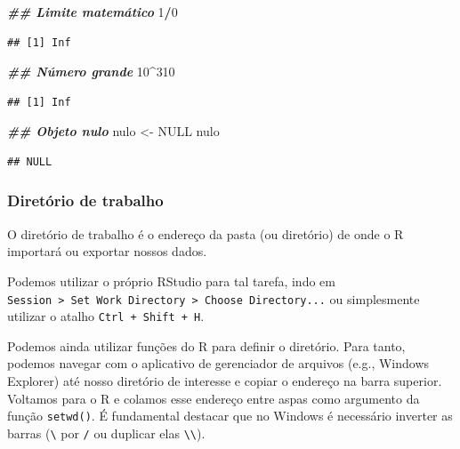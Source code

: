 \documentclass[
]{article}
\newenvironment{Shaded}{\begin{snugshade}}{\end{snugshade}}
\newcommand{\ConstantTok}[1]{\textcolor[rgb]{0.56,0.35,0.01}{#1}}
\newcommand{\DecValTok}[1]{\textcolor[rgb]{0.00,0.00,0.81}{#1}}
\newcommand{\DocumentationTok}[1]{\textcolor[rgb]{0.56,0.35,0.01}{\textbf{\textit{#1}}}}
\newcommand{\NormalTok}[1]{#1}
\newcommand{\OtherTok}[1]{\textcolor[rgb]{0.56,0.35,0.01}{#1}}
\newcommand{\SpecialCharTok}[1]{\textcolor[rgb]{0.81,0.36,0.00}{\textbf{#1}}}
\begin{document}
\begin{Shaded}
\begin{Highlighting}[]
\DocumentationTok{\#\# Limite matemático}
\DecValTok{1}\SpecialCharTok{/}\DecValTok{0}
\end{Highlighting}
\end{Shaded}

\begin{verbatim}
## [1] Inf
\end{verbatim}

\begin{Shaded}
\begin{Highlighting}[]
\DocumentationTok{\#\# Número grande}
\DecValTok{10}\SpecialCharTok{\^{}}\DecValTok{310}
\end{Highlighting}
\end{Shaded}

\begin{verbatim}
## [1] Inf
\end{verbatim}

\begin{Shaded}
\begin{Highlighting}[]
\DocumentationTok{\#\# Objeto nulo}
\NormalTok{nulo }\OtherTok{\textless{}{-}} \ConstantTok{NULL}
\NormalTok{nulo}
\end{Highlighting}
\end{Shaded}

\begin{verbatim}
## NULL
\end{verbatim}

\hypertarget{diretuxf3rio-de-trabalho}{%
\subsubsection{Diretório de trabalho}\label{diretuxf3rio-de-trabalho}}

O diretório de trabalho é o endereço da pasta (ou diretório) de onde o R importará ou exportar nossos dados.

Podemos utilizar o próprio RStudio para tal tarefa, indo em \texttt{Session\ \textgreater{}\ Set\ Work\ Directory\ \textgreater{}\ Choose\ Directory...} ou simplesmente utilizar o atalho \texttt{Ctrl\ +\ Shift\ +\ H}.

Podemos ainda utilizar funções do R para definir o diretório. Para tanto, podemos navegar com o aplicativo de gerenciador de arquivos (e.g., Windows Explorer) até nosso diretório de interesse e copiar o endereço na barra superior. Voltamos para o R e colamos esse endereço entre aspas como argumento da função \texttt{setwd()}. É fundamental destacar que no Windows é necessário inverter as barras (\texttt{\textbackslash{}} por \texttt{/} ou duplicar elas \texttt{\textbackslash{}\textbackslash{}}).
\end{document}
